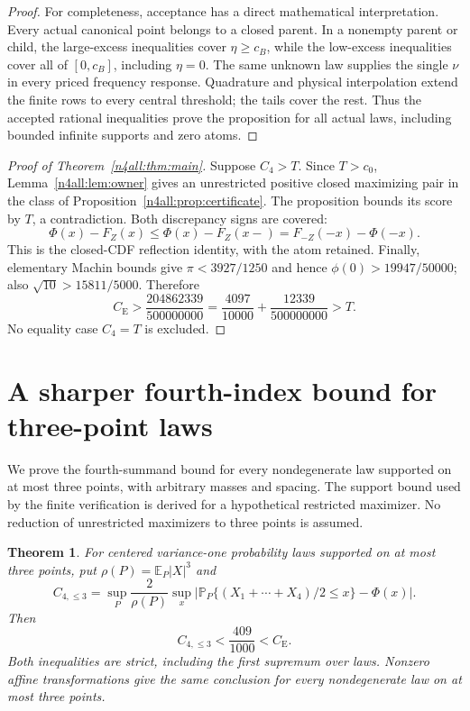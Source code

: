 \documentclass[11pt,a4paper]{article}
\numberwithin{equation}{section}
\newtheorem{theorem}{Theorem}[section]
\theoremstyle{definition}
\theoremstyle{remark}
\newcommand{\E}{\mathbb E}
\newcommand{\Pp}{\mathbb P}
\newcommand{\CE}{C_{\mathrm E}}
\begin{document}
\begin{proof}
For completeness, acceptance has a direct mathematical interpretation.
Every actual canonical point belongs to a closed parent.
In a nonempty parent or child, the large-excess inequalities cover
$\eta\ge c_B$, while the low-excess inequalities cover all of
$[0,c_B]$, including $\eta=0$. The same unknown law supplies the
single $\nu$ in every priced frequency response. Quadrature and
physical interpolation extend the finite rows to every central
threshold; the tails cover the rest. Thus the accepted rational
inequalities prove the proposition for all actual laws, including
bounded infinite supports and zero atoms.
\end{proof}

\begin{proof}[Proof of Theorem~\ref{n4all:thm:main}]
Suppose $C_4>T$. Since $T>c_0$, Lemma~\ref{n4all:lem:owner} gives
an unrestricted positive closed maximizing pair in the class of
Proposition~\ref{n4all:prop:certificate}. The proposition bounds its
score by $T$, a contradiction. Both discrepancy signs are covered:
\[
 \Phi(x)-F_Z(x)\le\Phi(x)-F_Z(x-)
                     =F_{-Z}(-x)-\Phi(-x).
\]
This is the closed-CDF reflection identity, with the atom retained.
Finally, elementary Machin bounds give $\pi<3927/1250$ and hence
$\phi(0)>19947/50000$; also $\sqrt{10}>15811/5000$. Therefore
\[
 \CE>\frac{204862339}{500000000}
       =\frac{4097}{10000}+\frac{12339}{500000000}>T.
\]
No equality case $C_4=T$ is excluded.
\end{proof}

\section{A sharper fourth-index bound for three-point laws}\label{n4:section}

We prove the fourth-summand bound for every nondegenerate law supported
on at most three points, with arbitrary masses and spacing. The support
bound used by the finite verification is derived for a hypothetical
restricted maximizer. No reduction of unrestricted maximizers to three
points is assumed.

\begin{theorem}\label{n4:thm:main}
For centered variance-one probability laws supported on at most three
points, put $\rho(P)=\E_P|X|^3$ and
\[
 C_{4,\le3}=\sup_P\frac{2}{\rho(P)}
   \sup_x\left|\Pp_P\{(X_1+\cdots+X_4)/2\le x\}-\Phi(x)\right|.
\]
Then
\[
                    C_{4,\le3}<\frac{409}{1000}<\CE.
\]
Both inequalities are strict, including the first supremum over laws.
Nonzero affine transformations give the same conclusion for every
nondegenerate law on at most three points.
\end{theorem}
\end{document}
